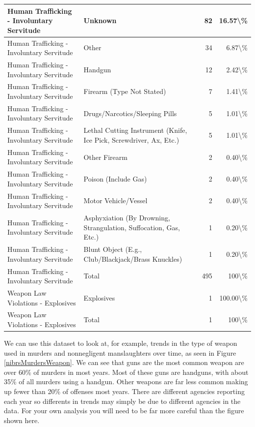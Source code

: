 \documentclass[
]{krantz}
\begin{document}
\begin{longtable}[t]{l|l|r|r}
\hline
Human Trafficking - Involuntary Servitude & Unknown & 82 & 16.57\textbackslash{}\%\\
\hline
Human Trafficking - Involuntary Servitude & Other & 34 & 6.87\textbackslash{}\%\\
\hline
Human Trafficking - Involuntary Servitude & Handgun & 12 & 2.42\textbackslash{}\%\\
\hline
Human Trafficking - Involuntary Servitude & Firearm (Type Not Stated) & 7 & 1.41\textbackslash{}\%\\
\hline
Human Trafficking - Involuntary Servitude & Drugs/Narcotics/Sleeping Pills & 5 & 1.01\textbackslash{}\%\\
\hline
Human Trafficking - Involuntary Servitude & Lethal Cutting Instrument (Knife, Ice Pick, Screwdriver, Ax, Etc.) & 5 & 1.01\textbackslash{}\%\\
\hline
Human Trafficking - Involuntary Servitude & Other Firearm & 2 & 0.40\textbackslash{}\%\\
\hline
Human Trafficking - Involuntary Servitude & Poison (Include Gas) & 2 & 0.40\textbackslash{}\%\\
\hline
Human Trafficking - Involuntary Servitude & Motor Vehicle/Vessel & 2 & 0.40\textbackslash{}\%\\
\hline
Human Trafficking - Involuntary Servitude & Asphyxiation (By Drowning, Strangulation, Suffocation, Gas, Etc.) & 1 & 0.20\textbackslash{}\%\\
\hline
Human Trafficking - Involuntary Servitude & Blunt Object (E.g., Club/Blackjack/Brass Knuckles) & 1 & 0.20\textbackslash{}\%\\
\hline
Human Trafficking - Involuntary Servitude & Total & 495 & 100\textbackslash{}\%\\
\hline
Weapon Law Violations - Explosives & Explosives & 1 & 100.00\textbackslash{}\%\\
\hline
Weapon Law Violations - Explosives & Total & 1 & 100\textbackslash{}\%\\
\hline
\end{longtable}

We can use this dataset to look at, for example, trends in
the type of weapon used in murders and nonnegligent
manslaughters over time, as seen in Figure
\ref{nibrsMurdersWeapon}. We can see that guns are the most
common weapon are over 60\% of murders in most years. Most
of these guns are handguns, with about 35\% of all murders
using a handgun. Other weapons are far less common making up
fewer than 20\% of offenses most years. There are different
agencies reporting each year so differents in trends may
simply be due to different agencies in the data. For your
own analysis you will need to be far more careful than the
figure shown here.
\end{document}
